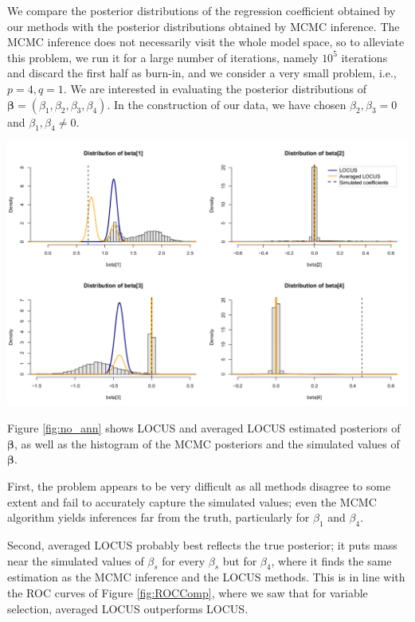 \documentclass[final]{beamer}
\newenvironment{Figure}
  {\par\noindent\minipage{\linewidth}}
  {\endminipage\par}
\begin{document}
\begin{multicols*}{3}
We compare the posterior distributions of the regression coefficient obtained by our methods with the posterior distributions obtained by MCMC inference. The MCMC inference does not necessarily visit the whole model space, so to alleviate this problem, we run it for a large number of iterations, namely $10^5$ iterations and discard the first half as burn-in, and we consider a very small problem, i.e., $p=4, q=1$. We are interested in evaluating the posterior distributions of $\boldsymbol{\beta} = (\beta_1, \beta_2, \beta_3, \beta_4)$. In the construction of our data, we have chosen $\beta_2, \beta_3 = 0$ and $\beta_1, \beta_4 \neq 0$.
\begin{Figure}
\centering
\includegraphics[width=6in, bb=0 0 800px 600px]{images/no_annealing.pdf}
\end{Figure}
\vspace{1em}
Figure \ref{fig:no_ann} shows LOCUS and averaged LOCUS estimated posteriors of $\boldsymbol{\beta}$, as well as the histogram of the MCMC posteriors and the simulated values of $\boldsymbol{\beta}$. 

First, the problem appears to be very difficult as all methods disagree to some extent and fail to accurately capture the simulated values; even the MCMC algorithm yields inferences far from the truth, particularly for $\beta_1$ and $\beta_4$.

Second, averaged LOCUS probably best reflects the true posterior; it puts mass near the simulated values of $\beta_s$ for every $\beta_s$ but for $\beta_4$, where it finds the same estimation as the MCMC inference and the LOCUS methods. This is in line with the ROC curves of Figure \ref{fig:ROCComp}, where we saw that for variable selection, averaged LOCUS outperforms LOCUS.


\end{multicols*}
\end{document}
